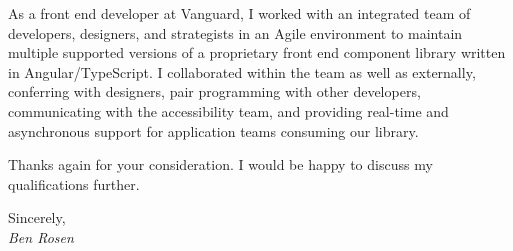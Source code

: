 As a front end developer at Vanguard, I worked with an integrated team of
developers, designers, and strategists in an Agile environment to maintain
multiple supported versions of a proprietary front end component library written
in Angular/TypeScript. I collaborated within the team as well as externally,
conferring with designers, pair programming with other developers, communicating
with the accessibility team, and providing real-time and asynchronous support
for application teams consuming our library.

Thanks again for your consideration. I would be happy to discuss my
qualifications further.

Sincerely, \\
\emph{Ben Rosen}

